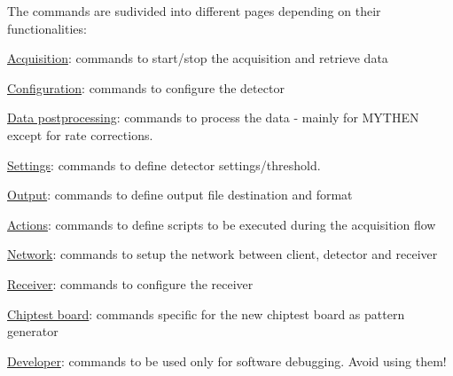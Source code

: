 The commands are sudivided into different pages depending on their functionalities:
\begin{DoxyItemize}
\item \hyperlink{acquisition}{Acquisition}: commands to start/stop the acquisition and retrieve data
\item \hyperlink{config}{Configuration}: commands to configure the detector
\item \hyperlink{data}{Data postprocessing}: commands to process the data -\/ mainly for MYTHEN except for rate corrections.
\item \hyperlink{settings}{Settings}: commands to define detector settings/threshold.
\item \hyperlink{output}{Output}: commands to define output file destination and format
\item \hyperlink{actions}{Actions}: commands to define scripts to be executed during the acquisition flow
\item \hyperlink{network}{Network}: commands to setup the network between client, detector and receiver
\item \hyperlink{receiver}{Receiver}: commands to configure the receiver
\item \hyperlink{ctb}{Chiptest board}: commands specific for the new chiptest board as pattern generator
\item \hyperlink{test}{Developer}: commands to be used only for software debugging. Avoid using them! 
\end{DoxyItemize}